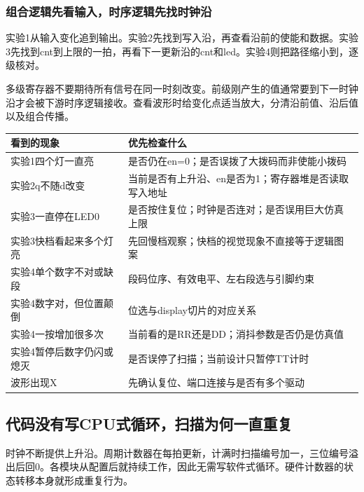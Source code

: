 \subsubsection{组合逻辑先看输入，时序逻辑先找时钟沿}
实验1从输入变化追到输出。实验2先找到写入沿，再查看沿前的使能和数据。实验3先找到cnt到上限的一拍，再看下一更新沿的cnt和led。实验4则把路径缩小到，逐级核对。

多级寄存器不要期待所有信号在同一时刻改变。前级刚产生的值通常要到下一时钟沿才会被下游时序逻辑接收。查看波形时给变化点适当放大，分清沿前值、沿后值以及组合传播。

\begin{center}
\begin{tabularx}{\linewidth}{@{}XX@{}}\toprule
看到的现象 & 优先检查什么\\\midrule
实验1四个灯一直亮 & 是否仍在en=0；是否误拨了大拨码而非使能小拨码\\
实验2q不随d改变 & 当前是否有上升沿、en是否为1；寄存器堆是否读取写入地址\\
实验3一直停在LED0 & 是否按住复位；时钟是否连对；是否误用巨大仿真上限\\
实验3快档看起来多个灯亮 & 先回慢档观察；快档的视觉现象不直接等于逻辑图案\\
实验4单个数字不对或缺段 & 段码位序、有效电平、左右段选与引脚约束\\
实验4数字对，但位置颠倒 & 位选与display切片的对应关系\\
实验4一按增加很多次 & 当前看的是RR还是DD；消抖参数是否仍是仿真值\\
实验4暂停后数字仍闪或熄灭 & 是否误停了扫描；当前设计只暂停TT计时\\
波形出现X & 先确认复位、端口连接与是否有多个驱动\\\bottomrule
\end{tabularx}
\end{center}

\subsection{代码没有写CPU式循环，扫描为何一直重复}
时钟不断提供上升沿。周期计数器在每拍更新，计满时扫描编号加一，三位编号溢出后回0。各模块从配置后就持续工作，因此无需写软件式循环。硬件计数器的状态转移本身就形成重复行为。

